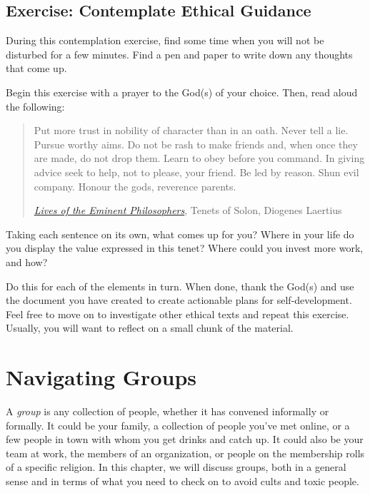 \documentclass[
]{book}
\begin{document}
\hypertarget{exercise-contemplate-ethical-guidance}{%
\section{Exercise: Contemplate Ethical Guidance}\label{exercise-contemplate-ethical-guidance}}

During this contemplation exercise, find some time when you will not be disturbed for a few minutes. Find a pen and paper to write down any thoughts that come up.

Begin this exercise with a prayer to the God(s) of your choice. Then, read aloud the following:

\begin{quote}
Put more trust in nobility of character than in an oath. Never tell a lie. Pursue worthy aims. Do not be rash to make friends and, when once they are made, do not drop them. Learn to obey before you command. In giving advice seek to help, not to please, your friend. Be led by reason. Shun evil company. Honour the gods, reverence parents.

\href{https://en.wikisource.org/wiki/Lives_of_the_Eminent_Philosophers/Book_I\#Tenets_of_Solon}{\emph{Lives of the Eminent Philosophers}}, Tenets of Solon, Diogenes Laertius
\end{quote}

Taking each sentence on its own, what comes up for you? Where in your life do you display the value expressed in this tenet? Where could you invest more work, and how?

Do this for each of the elements in turn. When done, thank the God(s) and use the document you have created to create actionable plans for self-development. Feel free to move on to investigate other ethical texts and repeat this exercise. Usually, you will want to reflect on a small chunk of the material.

\hypertarget{navigating-groups}{%
\chapter{Navigating Groups}\label{navigating-groups}}

A \emph{group} is any collection of people, whether it has convened informally or formally. It could be your family, a collection of people you've met online, or a few people in town with whom you get drinks and catch up. It could also be your team at work, the members of an organization, or people on the membership rolls of a specific religion. In this chapter, we will discuss groups, both in a general sense and in terms of what you need to check on to avoid cults and toxic people.
\end{document}
